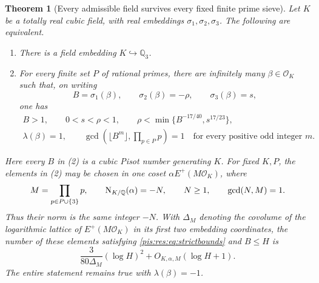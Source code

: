 \documentclass[11pt,a4paper]{article}
\newtheorem{theorem}{Theorem}[section]
\theoremstyle{definition}\newtheorem{definition}[theorem]{Definition}
\theoremstyle{remark}\newtheorem{remark}[theorem]{Remark}
\newcommand{\Q}{\mathbb Q}\newcommand{\R}{\mathbb R}
\begin{document}
\begin{theorem}[Every admissible field survives every fixed finite prime sieve]
\label{pis:res:thm:equivalence}
Let $K$ be a totally real cubic field, with real embeddings
$\sigma_1,\sigma_2,\sigma_3$. The following are equivalent.
\begin{enumerate}
\item There is a field embedding $K\hookrightarrow\Q_3$.
\item For every finite set $P$ of rational primes, there are infinitely
many $\beta\in\mathcal O_K$ such that, on writing
\[
 B=\sigma_1(\beta),\qquad
 \sigma_2(\beta)=-\rho,\qquad \sigma_3(\beta)=s,
\]
one has
\begin{gather}
 B>1,\qquad 0<s<\rho<1,\qquad
 \rho<\min\{B^{-17/40},s^{17/23}\},
 \label{pis:res:eq:strictbounds}\\
 \lambda(\beta)=1,
 \qquad
 \gcd\left(\lfloor B^m\rfloor,\prod_{p\in P}p\right)=1
 \quad\text{for every positive odd integer }m.
 \label{pis:res:eq:avoid}
\end{gather}
\end{enumerate}
Here every $B$ in (2) is a cubic Pisot number generating $K$.
For fixed $K,P$, the elements in (2) may be chosen in one coset
$\alpha E^+(M\mathcal O_K)$, where
\[
 M=\prod_{p\in P\cup\{3\}}p,
 \qquad \Nm_{K/\Q}(\alpha)=-N,
 \qquad N\ge1,
 \qquad \gcd(N,M)=1.
\]
Thus their norm is the same integer $-N$. With
$\Delta_M$ denoting the covolume of the logarithmic lattice of
$E^+(M\mathcal O_K)$ in its first two embedding coordinates, the
number of these elements satisfying \eqref{pis:res:eq:strictbounds} and
$B\le H$ is
\begin{equation}
\label{pis:res:eq:count}
 \frac{3}{80\Delta_M}(\log H)^2
       +O_{K,\alpha,M}(\log H+1).
\end{equation}
The entire statement remains true with $\lambda(\beta)=-1$.
\end{theorem}
\end{document}
